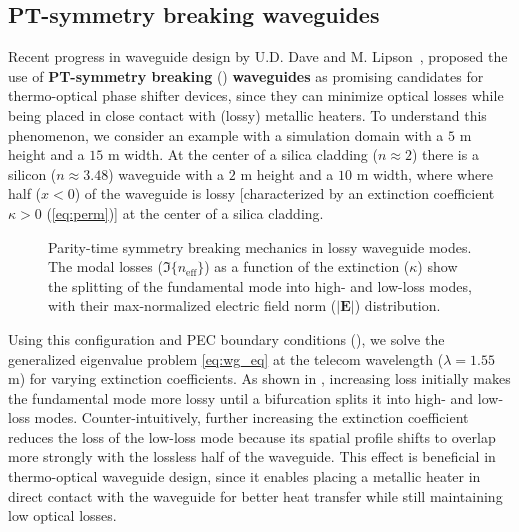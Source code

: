  \subsection*{PT-symmetry breaking waveguides}
 Recent progress in waveguide design by U.D. Dave and M. Lipson~\cite{lipson}, proposed the use of \textbf{PT-symmetry breaking} () \textbf{waveguides} as promising candidates for
 thermo-optical phase shifter devices, since they can minimize optical losses while being placed in close contact with (lossy) metallic heaters. To understand this phenomenon, we consider an example with a 
 simulation domain with a $5$ \textmu m height and a $15$ \textmu m width. At the center of a silica cladding ($n\approx 2$) there is a silicon ($n \approx 3.48$) waveguide with a $2$ \textmu m height and 
 a $10$ \textmu m width, where where half ($x<0$) of the waveguide is lossy [characterized by an extinction coefficient $\kappa>0$ (\eqref{eq:perm})]  at the center of a silica cladding.

\begin{figure}[tb]
    \centering
    \caption{Parity-time symmetry breaking mechanics in lossy waveguide modes. The modal losses ($\Im\{n_\text{eff}\}$) as a function of the extinction ($\kappa$) show the splitting of the fundamental mode into 
    high- and low-loss modes, with their max-normalized electric field norm ($\vert \mathbf{E} \vert$) distribution.}
    \label{fig:pt}
\end{figure}

Using this configuration and PEC boundary conditions (), we solve the generalized eigenvalue
 problem \eqref{eq:wg_eq} at the telecom wavelength ($\lambda = 1.55$ \textmu m) for varying extinction coefficients. 
 As shown in , increasing loss initially makes the fundamental mode more lossy until a bifurcation splits
  it into high- and low-loss modes. Counter-intuitively, further increasing the extinction coefficient reduces the loss of the low-loss mode 
  because its spatial profile shifts to overlap more strongly with the lossless half of the waveguide.
   This effect is beneficial in thermo-optical waveguide design, since it  enables placing a metallic heater in direct contact with the waveguide for better heat transfer while still
    maintaining low optical losses.


